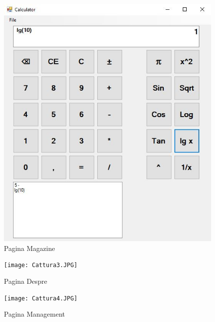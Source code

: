 \begin{figure}[!ht]
	
	\centering
	
	\includegraphics[width=1.0\textwidth]{Cattura2.JPG}
	
	\caption{Pagina Magazine}
	
	\label{Im_label}
	
\end{figure}

\begin{figure}[!ht]
	
	\centering
	
	\texttt{[image: Cattura3.JPG]}
	
	\caption{Pagina Despre}
	
	\label{Im_label}
	
\end{figure}

\begin{figure}[!ht]
	
	\centering
	
	\texttt{[image: Cattura4.JPG]}
	
	\caption{Pagina Management}
	
	\label{Im_label}
	
\end{figure}


